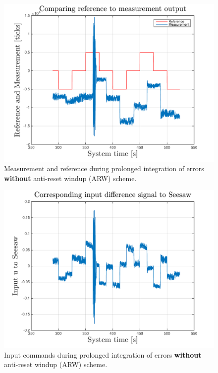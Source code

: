 \documentclass[12pt,a4paper,twocolumn]{article}
\begin{document}
\begin{figure}[ht]
\centering
\includegraphics[width=.95\linewidth]{figures/seesaw_measurement_task3_no_ARW_fig1}
\caption[Measure1]{\label{f:measure1} Measurement and reference during prolonged integration of errors \textbf{without} anti-reset windup (ARW) scheme.}
\label{fig:seesaw_measurement_task3_no_ARW_fig1}
\end{figure}


\begin{figure}[ht]
\centering
\includegraphics[width=.95\linewidth]{figures/seesaw_measurement_task3_no_ARW_fig2}
\caption[Measure1]{\label{f:measure1} Input commands during prolonged integration of errors \textbf{without} anti-reset windup (ARW) scheme.}
\label{fig:seesaw_measurement_task3_no_ARW_fig2}
\end{figure}
\end{document}
